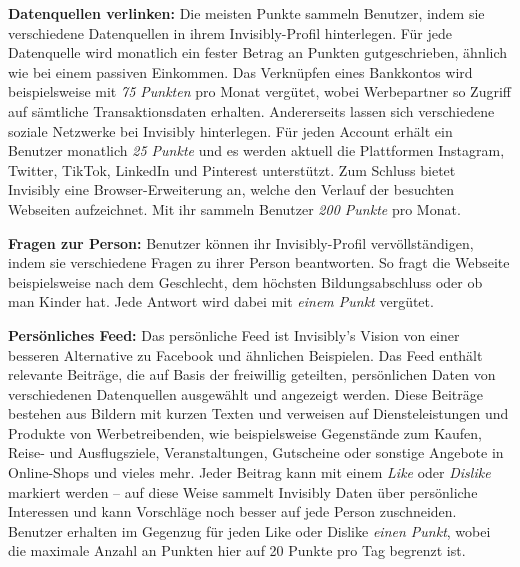 \noindent \textbf{Datenquellen verlinken:} Die meisten Punkte sammeln Benutzer, indem sie verschiedene Datenquellen in ihrem Invisibly-Profil hinterlegen. Für jede Datenquelle wird monatlich ein fester Betrag an Punkten gutgeschrieben, ähnlich wie bei einem passiven Einkommen. \cite{pymntsInvisibly_2021} Das Verknüpfen eines Bankkontos wird beispielsweise mit \textit{75 Punkten} pro Monat vergütet, wobei Werbepartner so Zugriff auf sämtliche Transaktionsdaten erhalten. Andererseits lassen sich verschiedene soziale Netzwerke bei Invisibly hinterlegen. Für jeden Account erhält ein Benutzer monatlich \textit{25 Punkte} und es werden aktuell die Plattformen Instagram, Twitter, TikTok, LinkedIn und Pinterest unterstützt. Zum Schluss bietet Invisibly eine Browser-Erweiterung an, welche den Verlauf der besuchten Webseiten aufzeichnet. Mit ihr sammeln Benutzer \textit{200 Punkte} pro Monat. \cite{instagramInvisibly_2021, lifewireInvisibly_2021} \newline

\noindent \textbf{Fragen zur Person:} Benutzer können ihr Invisibly-Profil vervöllständigen, indem sie verschiedene Fragen zu ihrer Person beantworten. So fragt die Webseite beispielsweise nach dem Geschlecht, dem höchsten Bildungsabschluss oder ob man Kinder hat. Jede Antwort wird dabei mit \textit{einem Punkt} vergütet. \cite{instagramInvisibly_2021} \newline

\noindent \textbf{Persönliches Feed:} Das persönliche Feed ist Invisibly's Vision von einer besseren Alternative zu Facebook und ähnlichen Beispielen. Das Feed enthält relevante Beiträge, die auf Basis der freiwillig geteilten, persönlichen Daten von verschiedenen Datenquellen ausgewählt und angezeigt werden. Diese Beiträge bestehen aus Bildern mit kurzen Texten und verweisen auf Diensteleistungen und Produkte von Werbetreibenden, wie beispielsweise Gegenstände zum Kaufen, Reise- und Ausflugsziele, Veranstaltungen, Gutscheine oder sonstige Angebote in Online-Shops und vieles mehr. Jeder Beitrag kann mit einem \textit{Like} oder \textit{Dislike} markiert werden -- auf diese Weise sammelt Invisibly Daten über persönliche Interessen und kann Vorschläge noch besser auf jede Person zuschneiden. Benutzer erhalten im Gegenzug für jeden Like oder Dislike \textit{einen Punkt}, wobei die maximale Anzahl an Punkten hier auf 20 Punkte pro Tag begrenzt ist. \cite{invisiblyWhyPay_2021} \newline

